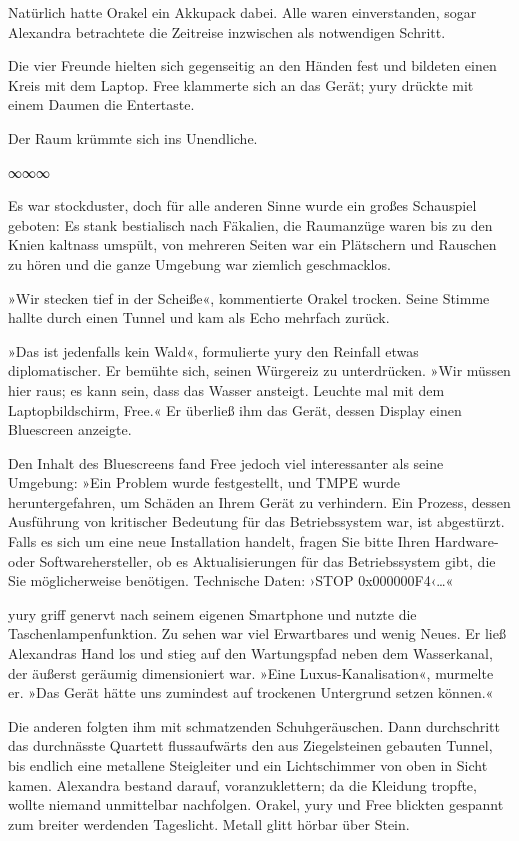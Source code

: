 Natürlich hatte Orakel ein Akkupack dabei. Alle waren einverstanden, sogar Alexandra betrachtete die Zeitreise inzwischen als notwendigen Schritt.

Die vier Freunde hielten sich gegenseitig an den Händen fest und bildeten einen Kreis mit dem Laptop. Free klammerte sich an das Gerät; yury drückte mit einem Daumen die Entertaste.

Der Raum krümmte sich ins Unendliche.

\begin{center}
∞∞∞
\end{center}

Es war stockduster, doch für alle anderen Sinne wurde ein großes Schauspiel geboten: Es stank bestialisch nach Fäkalien, die Raumanzüge waren bis zu den Knien kaltnass umspült, von mehreren Seiten war ein Plätschern und Rauschen zu hören und die ganze Umgebung war ziemlich geschmacklos.

»Wir stecken tief in der Scheiße«, kommentierte Orakel trocken. Seine Stimme hallte durch einen Tunnel und kam als Echo mehrfach zurück.

»Das ist jedenfalls kein Wald«, formulierte yury den Reinfall etwas diplomatischer. Er bemühte sich, seinen Würgereiz zu unterdrücken. »Wir müssen hier raus; es kann sein, dass das Wasser ansteigt. Leuchte mal mit dem Laptopbildschirm, Free.« Er überließ ihm das Gerät, dessen Display einen Bluescreen anzeigte.

Den Inhalt des Bluescreens fand Free jedoch viel interessanter als seine Umgebung: »Ein Problem wurde festgestellt, und TMPE wurde heruntergefahren, um Schäden an Ihrem Gerät zu verhindern. Ein Prozess, dessen Ausführung von kritischer Bedeutung für das Betriebssystem war, ist abgestürzt. Falls es sich um eine neue Installation handelt, fragen Sie bitte Ihren Hardware- oder Softwarehersteller, ob es Aktualisierungen für das Betriebssystem gibt, die Sie möglicherweise benötigen. Technische Daten: ›STOP 0x000000F4‹…«

yury griff genervt nach seinem eigenen Smartphone und nutzte die Taschenlampenfunktion. Zu sehen war viel Erwartbares und wenig Neues. Er ließ Alexandras Hand los und stieg auf den Wartungspfad neben dem Wasserkanal, der äußerst geräumig dimensioniert war. »Eine Luxus-Kanalisation«, murmelte er. »Das Gerät hätte uns zumindest auf trockenen Untergrund setzen können.«

Die anderen folgten ihm mit schmatzenden Schuhgeräuschen. Dann durchschritt das durchnässte Quartett flussaufwärts den aus Ziegelsteinen gebauten Tunnel, bis endlich eine metallene Steigleiter und ein Lichtschimmer von oben in Sicht kamen. Alexandra bestand darauf, voranzuklettern; da die Kleidung tropfte, wollte niemand unmittelbar nachfolgen. Orakel, yury und Free blickten gespannt zum breiter werdenden Tageslicht. Metall glitt hörbar über Stein.


